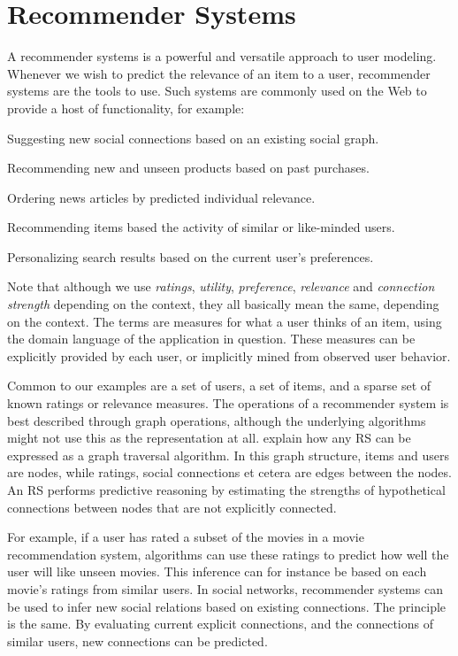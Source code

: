 \section{Recommender Systems}
\label{sec:recommender}

A recommender systems is a powerful and versatile approach to user modeling.
Whenever we wish to predict the relevance of an item to a user, recommender systems are the tools to use.
Such systems are commonly used on the Web to provide a host of functionality,
for example:

\begin{itemize*}
  \item Suggesting new social connections based on an existing social graph.
  \item Recommending new and unseen products based on past purchases.
  \item Ordering news articles by predicted individual relevance.
  \item Recommending items based the activity of similar or like-minded users.
  \item Personalizing search results based on the current user's preferences.
\end{itemize*}

Note that although we use \emph{ratings}, \emph{utility}, \emph{preference}, \emph{relevance} and \emph{connection strength} depending on the context, 
they all basically mean the same, depending on the context. 
The terms are measures for what a user thinks of an item, using the domain language of the application in question.
These measures can be explicitly provided by each user, or implicitly mined from observed user behavior.

Common to our examples are a set of users, a set of items, and a sparse set of known ratings or relevance measures.
The operations of a recommender system is best described through graph operations, 
although the underlying algorithms might not use this as the representation at all.
\cite{Mirza2003} explain how any RS can be expressed as a graph traversal algorithm.
In this graph structure, items and users are nodes, while ratings, social connections et cetera are edges between the nodes.
An RS performs predictive reasoning by estimating the strengths of hypothetical connections between nodes that are not explicitly connected.

For example, if a user has rated a subset of the movies in a movie recommendation system, 
algorithms can use these ratings to predict how well the user will like unseen movies.
This inference can for instance be based on each movie's ratings from similar users.
In social networks, recommender systems can be used to infer new social relations 
based on existing connections. The principle is the same. By evaluating current explicit
connections, and the connections of similar users, new connections can be predicted.

